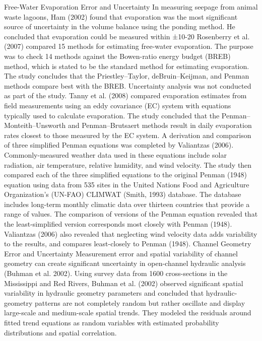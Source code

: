 \begin{linenumbers}
Free-Water Evaporation Error and Uncertainty
In measuring seepage from animal waste lagoons, Ham (2002) found that evaporation was the most significant source of uncertainty in the volume balance using the ponding method.  He concluded that evaporation could be measured within ±10-20%
Rosenberry et al. (2007) compared 15 methods for estimating free-water evaporation.  The purpose was to check 14 methods against the Bowen-ratio energy budget (BREB) method, which is stated to be the standard method for estimating evaporation.  The study concludes that the Priestley–Taylor, deBruin–Keijman, and Penman methods compare best with the BREB.  Uncertainty analysis was not conducted as part of the study.
Tanny et al. (2008) compared evaporation estimates from field measurements using an eddy covariance (EC) system with equations typically used to calculate evaporation.  The study concluded that the Penman–Monteith–Unsworth and Penman–Brutsaert methods result in daily evaporation rates closest to those measured by the EC system.
A derivation and comparison of three simplified Penman equations was completed by Valiantzas (2006).  Commonly-measured weather data used in these equations include solar radiation, air temperature, relative humidity, and wind velocity.  The study then compared each of the three simplified equations to the original Penman (1948) equation using data from 535 sites in the United Nations Food and Agriculture Organization's (UN-FAO) CLIMWAT (Smith, 1993) database.  The database includes long-term monthly climatic data over thirteen countries that provide a range of values.  The comparison of versions of the Penman equation revealed that the least-simplified version corresponds most closely with Penman (1948).  Valiantzas (2006) also revealed that neglecting wind velocity data adds variability to the results, and compares least-closely to Penman (1948).
Channel Geometry Error and Uncertainty
Measurement error and spatial variability of channel geometry can create significant uncertainty in open-channel hydraulic analysis (Buhman et al. 2002).  Using survey data from 1600 cross-sections in the Mississippi and Red Rivers, Buhman et al. (2002) observed significant spatial variability in hydraulic geometry parameters and concluded that hydraulic-geometry patterns are not completely random but rather oscillate and display large-scale and medium-scale spatial trends.  They modeled the residuals around fitted trend equations as random variables with estimated probability distributions and spatial correlation.

\end{linenumbers}
